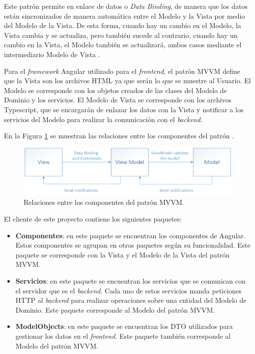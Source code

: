 Este patrón permite en enlace de datos o \textit{Data Binding}, de manera que los datos están sincronizados de manera automática entre el Modelo y la Vista por medio del Modelo de la Vista. De esta forma, cuando hay un cambio en el Modelo, la Vista cambia y se actualiza, pero también sucede al contrario, cuando hay un cambio en la Vista, el Modelo también se actualizará, ambos casos mediante el intermediario Modelo de Vista \cite{data-binding}.

Para el \textit{framework} Angular utilizado para el \textit{frontend}, el patrón MVVM define que la Vista son los archivos HTML ya que serán lo que se muestre al Usuario. El Modelo se corresponde con los objetos creados de las clases del Modelo de Dominio y los servicios. El Modelo de Vista se corresponde con los archivos Typescript, que se encargarán de enlazar los datos con la Vista y notificar a los servicios del Modelo para realizar la comunicación con el \textit{backend}.

En la Figura \ref{fig:mvvm} se muestran las relaciones entre los componentes del patrón \cite{mvvm-foto}.

\begin{figure}[H]
    \centering
    \includegraphics[scale=0.75]{img/mvvm.jpg}
    \caption{Relaciones entre los componentes del patrón MVVM. }
    \label{fig:mvvm}
\end{figure}





El cliente de este proyecto contiene los siguientes paquetes:
\begin{itemize}
    \item \textbf{Componentes}: en este paquete se encuentran los componentes de Angular. Estos componentes se agrupan en otros paquetes según su funcionalidad. Este paquete se corresponde con la Vista y el Modelo de la Vista del patrón MVVM.
    \item \textbf{Servicios}: en este paquete se encuentran los servicios que se comunican con el servidor que es el \textit{backend}. Cada uno de estos servicios manda peticiones HTTP al \textit{backend} para realizar operaciones sobre una entidad del Modelo de Dominio. Este paquete corresponde al Modelo del patrón MVVM.
    \item \textbf{ModelObjects}: en este paquete se encuentran los DTO utilizados para gestionar los datos en el \textit{frontend}. Este paquete también corresponde al Modelo del patrón MVVM.
\end{itemize}

